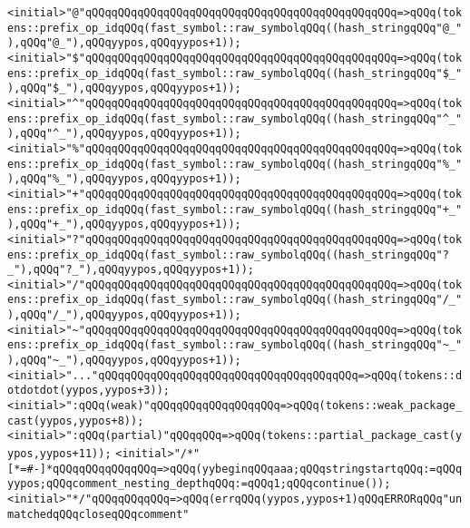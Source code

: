 \verb|<initial>"@"qQQqqQQqqQQqqQQqqQQqqQQqqQQqqQQqqQQqqQQqqQQqqQQq=>qQQq(tokens::prefix_op_idqQQq(fast_symbol::raw_symbolqQQq((hash_stringqQQq"@_"),qQQq"@_"),qQQqyypos,qQQqyypos+1));|\newline
\verb|<initial>"$"qQQqqQQqqQQqqQQqqQQqqQQqqQQqqQQqqQQqqQQqqQQqqQQq=>qQQq(tokens::prefix_op_idqQQq(fast_symbol::raw_symbolqQQq((hash_stringqQQq"$_"),qQQq"$_"),qQQqyypos,qQQqyypos+1));|\newline
\verb|<initial>"^"qQQqqQQqqQQqqQQqqQQqqQQqqQQqqQQqqQQqqQQqqQQqqQQq=>qQQq(tokens::prefix_op_idqQQq(fast_symbol::raw_symbolqQQq((hash_stringqQQq"^_"),qQQq"^_"),qQQqyypos,qQQqyypos+1));|\newline
\verb|<initial>"%"qQQqqQQqqQQqqQQqqQQqqQQqqQQqqQQqqQQqqQQqqQQqqQQq=>qQQq(tokens::prefix_op_idqQQq(fast_symbol::raw_symbolqQQq((hash_stringqQQq"%_"),qQQq"%_"),qQQqyypos,qQQqyypos+1));|\newline
\verb|<initial>"+"qQQqqQQqqQQqqQQqqQQqqQQqqQQqqQQqqQQqqQQqqQQqqQQq=>qQQq(tokens::prefix_op_idqQQq(fast_symbol::raw_symbolqQQq((hash_stringqQQq"+_"),qQQq"+_"),qQQqyypos,qQQqyypos+1));|\newline
\verb|<initial>"?"qQQqqQQqqQQqqQQqqQQqqQQqqQQqqQQqqQQqqQQqqQQqqQQq=>qQQq(tokens::prefix_op_idqQQq(fast_symbol::raw_symbolqQQq((hash_stringqQQq"?_"),qQQq"?_"),qQQqyypos,qQQqyypos+1));|\newline
\verb|<initial>"/"qQQqqQQqqQQqqQQqqQQqqQQqqQQqqQQqqQQqqQQqqQQqqQQq=>qQQq(tokens::prefix_op_idqQQq(fast_symbol::raw_symbolqQQq((hash_stringqQQq"/_"),qQQq"/_"),qQQqyypos,qQQqyypos+1));|\newline
\verb|<initial>"~"qQQqqQQqqQQqqQQqqQQqqQQqqQQqqQQqqQQqqQQqqQQqqQQq=>qQQq(tokens::prefix_op_idqQQq(fast_symbol::raw_symbolqQQq((hash_stringqQQq"~_"),qQQq"~_"),qQQqyypos,qQQqyypos+1));|\newline
\verb|<initial>"..."qQQqqQQqqQQqqQQqqQQqqQQqqQQqqQQqqQQqqQQq=>qQQq(tokens::dotdotdot(yypos,yypos+3));|\newline
\verb|<initial>":qQQq(weak)"qQQqqQQqqQQqqQQqqQQq=>qQQq(tokens::weak_package_cast(yypos,yypos+8));|\newline
\verb|<initial>":qQQq(partial)"qQQqqQQq=>qQQq(tokens::partial_package_cast(yypos,yypos+11));|\newline
\verb|<initial>"/*"[*=#-]*qQQqqQQqqQQqqQQq=>qQQq(yybeginqQQqaaa;qQQqstringstartqQQq:=qQQqyypos;qQQqcomment_nesting_depthqQQq:=qQQq1;qQQqcontinue());|\newline
\verb|<initial>"*/"qQQqqQQqqQQq=>qQQq(errqQQq(yypos,yypos+1)qQQqERRORqQQq"unmatchedqQQqcloseqQQqcomment"|\newline
